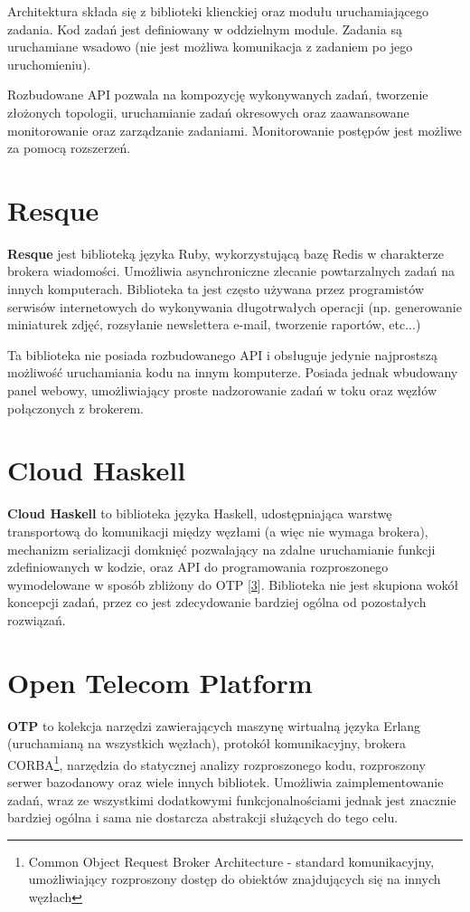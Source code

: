 Architektura składa się z biblioteki klienckiej oraz modułu uruchamiającego zadania. Kod zadań jest definiowany w oddzielnym module. Zadania są uruchamiane wsadowo (nie jest możliwa komunikacja z zadaniem po jego uruchomieniu).

Rozbudowane API pozwala na kompozycję wykonywanych zadań, tworzenie złożonych topologii, uruchamianie zadań okresowych oraz zaawansowane monitorowanie oraz zarządzanie zadaniami. Monitorowanie postępów jest możliwe za pomocą rozszerzeń.

\section{Resque}
\textbf{Resque} jest biblioteką języka Ruby, wykorzystującą bazę Redis w charakterze brokera wiadomości. Umożliwia asynchroniczne zlecanie powtarzalnych zadań na innych komputerach. Biblioteka ta jest często używana przez programistów serwisów internetowych do wykonywania długotrwałych operacji (np. generowanie miniaturek zdjęć, rozsyłanie newslettera e-mail, tworzenie raportów, etc...) 

Ta biblioteka nie posiada rozbudowanego API i obsługuje jedynie najprostszą możliwość uruchamiania kodu na innym komputerze. Posiada jednak wbudowany panel webowy, umożliwiający proste nadzorowanie zadań w toku oraz węzłów połączonych z brokerem. 
\newpage
\section{Cloud Haskell}
\textbf{Cloud Haskell} to biblioteka języka Haskell, udostępniająca warstwę transportową do komunikacji między węzłami (a więc nie wymaga brokera), mechanizm serializacji domknięć pozwalający na zdalne uruchamianie funkcji zdefiniowanych w kodzie, oraz API do programowania rozproszonego wymodelowane w sposób zbliżony do OTP [\ref{sec:otp}]. Biblioteka nie jest skupiona wokół koncepcji zadań, przez co jest zdecydowanie bardziej ogólna od pozostałych rozwiązań.

\section{Open Telecom Platform}
\label{sec:otp}
\textbf{OTP} to kolekcja narzędzi zawierających maszynę wirtualną języka Erlang (uruchamianą na wszystkich węzłach), protokół komunikacyjny, brokera CORBA\footnote{Common Object Request Broker Architecture - standard komunikacyjny, umożliwiający rozproszony dostęp do obiektów znajdujących się na innych węzłach}, narzędzia do statycznej analizy rozproszonego kodu, rozproszony serwer bazodanowy oraz wiele innych bibliotek. Umożliwia zaimplementowanie zadań, wraz ze wszystkimi dodatkowymi funkcjonalnościami jednak jest znacznie bardziej ogólna i sama nie dostarcza abstrakcji służących do tego celu.

















